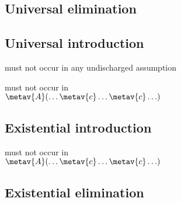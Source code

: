 \begin{multicols}{2}
\subsection*{Universal elimination}

\begin{fitchproof}
	 
\end{fitchproof}

\subsection*{Universal introduction}

\begin{fitchproof}
	 
\end{fitchproof}

\medskip\begin{raggedright}
 must not occur in any undischarged assumption

 must not occur in\\ $\metav{A}(\ldots \metav{c} \ldots \metav{c}\ldots)$
\end{raggedright}

\subsection*{Existential introduction}

\begin{fitchproof}
\end{fitchproof}

\medskip\begin{raggedright}
\noindent {} must not occur in\\ $\metav{A}(\ldots \metav{c} \ldots \metav{c}\ldots)$
\end{raggedright}

\subsection*{Existential elimination}


\end{multicols}
